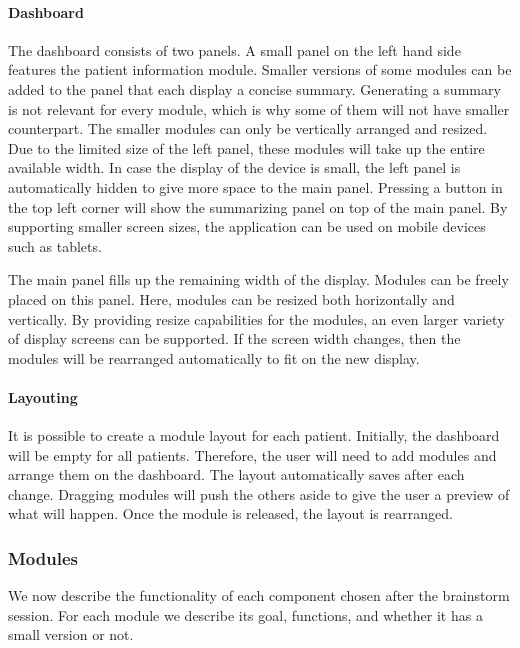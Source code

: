         \paragraph{Dashboard} The dashboard consists of two panels. A small panel on the left hand side features the patient information module. Smaller versions of some modules can be added to the panel that each display a concise summary. Generating a summary is not relevant for every module, which is why some of them will not have smaller counterpart. The smaller modules can only be vertically arranged and resized. Due to the limited size of the left panel, these modules will take up the entire available width. In case the display of the device is small, the left panel is automatically hidden to give more space to the main panel. Pressing a button in the top left corner will show the summarizing panel on top of the main panel. By supporting smaller screen sizes, the application can be used on mobile devices such as tablets.

        The main panel fills up the remaining width of the display. Modules can be freely placed on this panel. Here, modules can be resized both horizontally and vertically. By providing resize capabilities for the modules, an even larger variety of display screens can be supported. If the screen width changes, then the modules will be rearranged automatically to fit on the new display.

        \paragraph{Layouting} It is possible to create a module layout for each patient. Initially, the dashboard will be empty for all patients. Therefore, the user will need to add modules and arrange them on the dashboard. The layout automatically saves after each change. Dragging modules will push the others aside to give the user a preview of what will happen. Once the module is released, the layout is rearranged.

        \subsubsection{Modules}\label{app_specification_modules}

        We now describe the functionality of each component chosen after the brainstorm session. For each module we describe its goal, functions, and whether it has a small version or not.

